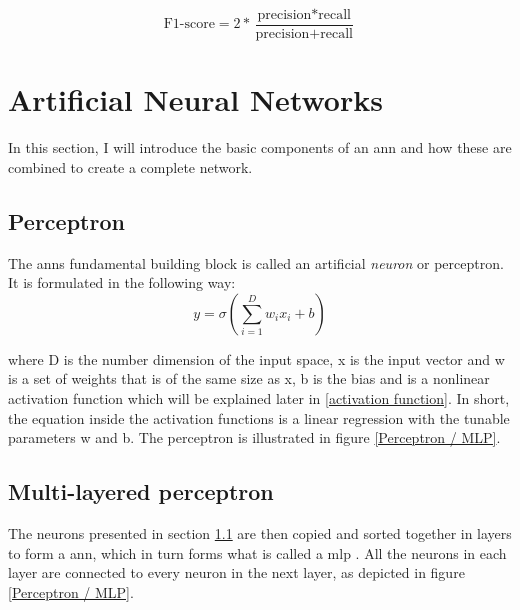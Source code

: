         \begin{equation}
            \textrm{F1-score} = 2 * \dfrac{\textrm{precision} * \textrm{recall}}{\textrm{precision} + \textrm{recall}}
        \end{equation}
        
        


\section{Artificial Neural Networks} \label{neural networks}
    In this section, I will introduce the basic components of an \gls{ann} and how these are combined to create a complete network.

    \subsection{Perceptron} \label{perceptron}
        The \gls{ann}s fundamental building block is called an artificial \textit{neuron} or perceptron. It is formulated in the following way\cite{razavi2021deep_exp_per}:
            \begin{equation} \label{eq_perceptron}
                y = \sigma(\sum_{i=1}^{D}w_ix_i + b)
            \end{equation}
            
        where D is the number dimension of the input space, x is the input vector and w is a set of weights that is of the same size as x, b is the bias and {\textsigma} is a nonlinear activation function which will be explained later in \ref{activation function}. In short, the equation inside the activation functions is a linear regression with the tunable parameters w and b. The perceptron is illustrated in figure \ref{Perceptron / MLP}.
    
    \subsection{Multi-layered perceptron} \label{MLP}
        The neurons presented in section \ref{perceptron} are then copied and sorted together in layers to form a \gls{ann}, which in turn forms what is called a \gls{mlp} \cite{razavi2021deep_exp_per}. All the neurons in each layer are connected to every neuron in the next layer, as depicted in figure \ref{Perceptron / MLP}.
        
